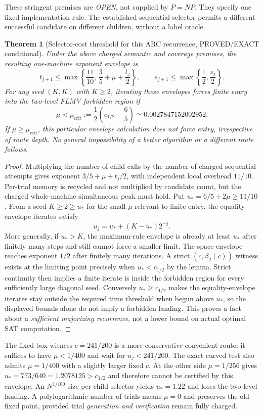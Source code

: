 \documentclass[11pt]{article}
\newtheorem{theorem}{Theorem}
\begin{document}
These stringent premises are \emph{OPEN}, not supplied by $P=NP$. They specify one fixed implementation rule. The established sequential selector permits a different successful candidate on different children, without a label oracle.

\begin{theorem}[Selector-cost threshold for this ARC recurrence, PROVED/EXACT conditional]
Under the above charged \emph{semantic and coverage premises}, the resulting one-machine exponent envelope is
\[
t_{j+1}\le\max\left\{\frac{11}{10},\,\frac35+\mu+\frac{t_j}{2}\right\},
\qquad
s_{j+1}\le\max\left\{\frac12,\frac{s_j}{2}\right\}.
\]
For any seed $(K,K)$ with $K\ge2$, iterating these envelopes forces finite entry into the two-level FLMV forbidden region if
\[
\boxed{\mu<\mu_{\mathrm{crit}}:=\frac12\left(c_{1/2}-\frac65\right)
\simeq0.0027847152002952.}
\]
If $\mu\ge\mu_{\mathrm{crit}}$, this \emph{particular envelope calculation} does not force entry, irrespective of route depth. No general impossibility of a better algorithm or a different route follows.
\end{theorem}
\begin{proof}
Multiplying the number of child calls by the number of charged sequential attempts gives exponent $3/5+\mu+t_j/2$, with independent local overhead $11/10$. Per-trial memory is recycled and not multiplied by candidate count, but the charged whole-machine simultaneous peak must hold. Put $u_*=6/5+2\mu\ge11/10$. From a seed $K\ge2\ge u_*$ for the small $\mu$ relevant to finite entry, the equality-envelope iterates satisfy
\[
u_j=u_*+(K-u_*)2^{-j}.
\]
More generally, if $u_*>K$, the maximum-rule envelope is already at least $u_*$ after finitely many steps and still cannot force a smaller limit. The space envelope reaches exponent $1/2$ after finitely many iterations. A strict $(c,\beta_2(c))$ witness exists at the limiting point precisely when $u_*<c_{1/2}$ by the lemma. Strict continuity then implies a finite iterate is inside the forbidden region for every sufficiently large diagonal seed. Conversely $u_*\ge c_{1/2}$ makes the equality-envelope iterates stay outside the required time threshold when begun above $u_*$, so the displayed bounds alone do not imply a forbidden landing. This proves a fact about a \emph{sufficient majorizing recurrence}, not a lower bound on actual optimal SAT computation.
\end{proof}

The fixed-box witness $c=241/200$ is a more conservative convenient route: it suffices to have $\mu<1/400$ and wait for $u_j<241/200$. The exact curved test also admits $\mu=1/400$ with a slightly larger fixed $c$. At the other side $\mu=1/256$ gives $u_*=773/640=1.2078125>c_{1/2}$ and therefore cannot be certified by this envelope. An $N^{1/100}$-size per-child selector yields $u_*=1.22$ and loses the two-level landing. A polylogarithmic number of trials means $\mu=0$ and preserves the old fixed point, provided trial \emph{generation and verification} remain fully charged.
\end{document}
